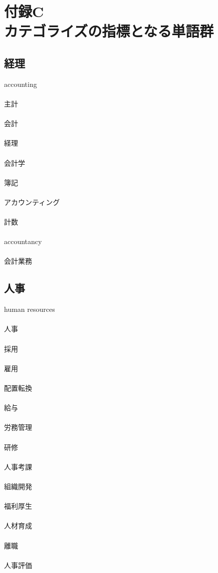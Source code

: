 \chapter*{付録C\\カテゴライズの指標となる単語群}

\setlength{\parindent}{0pt}

\section*{経理}
accounting
\\\\
主計
\\\\
会計
\\\\
経理
\\\\
会計学
\\\\
簿記
\\\\
アカウンティング
\\\\
計数
\\\\
accountancy
\\\\
会計業務

\clearpage
\section*{人事}
human resources
\\\\
人事
\\\\
採用
\\\\
雇用
\\\\
配置転換
\\\\
給与
\\\\
労務管理
\\\\
研修
\\\\
人事考課
\\\\
組織開発
\\\\
福利厚生
\\\\
人材育成
\\\\
離職
\\\\
人事評価

